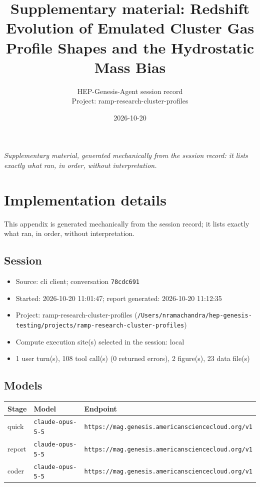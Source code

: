 \documentclass[11pt,a4paper]{article}
\title{Supplementary material: Redshift Evolution of Emulated Cluster Gas Profile Shapes and the Hydrostatic Mass Bias}
\author{HEP-Genesis-Agent session record \\ \small Project: ramp-research-cluster-profiles}
\date{2026-10-20}
\begin{document}
\maketitle
\noindent\textit{\small Supplementary material, generated mechanically from the session record: it lists exactly what ran, in order, without interpretation.}
\vspace{1em}



\appendix
\section{Implementation details}
\label{app:impl}
This appendix is generated mechanically from the session record; it lists exactly what ran, in order, without interpretation.
\subsection{Session}
\begin{itemize}
  \item Source: cli client; conversation \texttt{78cdc691}
  \item Started: 2026-10-20 11:01:47; report generated: 2026-10-20 11:12:35
  \item Project: ramp-research-cluster-profiles (\texttt{/\allowbreak{}Users/\allowbreak{}nramachandra/\allowbreak{}hep-genesis-testing/\allowbreak{}projects/\allowbreak{}ramp-research-cluster-profiles})
  \item Compute execution site(s) selected in the session: local
  \item 1 user turn(s), 108 tool call(s) (0 returned errors), 2 figure(s), 23 data file(s)
\end{itemize}
\subsection{Models}
\begin{longtable}{@{}p{}p{}p{}@{}}
\toprule Stage & Model & Endpoint \\ \midrule \endhead
quick & \texttt{claude-opus-5-5} & \texttt{https:\allowbreak{}/\allowbreak{}/\allowbreak{}mag.genesis.americansciencecloud.org/\allowbreak{}v1} \\
report & \texttt{claude-opus-5-5} & \texttt{https:\allowbreak{}/\allowbreak{}/\allowbreak{}mag.genesis.americansciencecloud.org/\allowbreak{}v1} \\
coder & \texttt{claude-opus-5-5} & \texttt{https:\allowbreak{}/\allowbreak{}/\allowbreak{}mag.genesis.americansciencecloud.org/\allowbreak{}v1} \\
\bottomrule\end{longtable}
\end{document}
